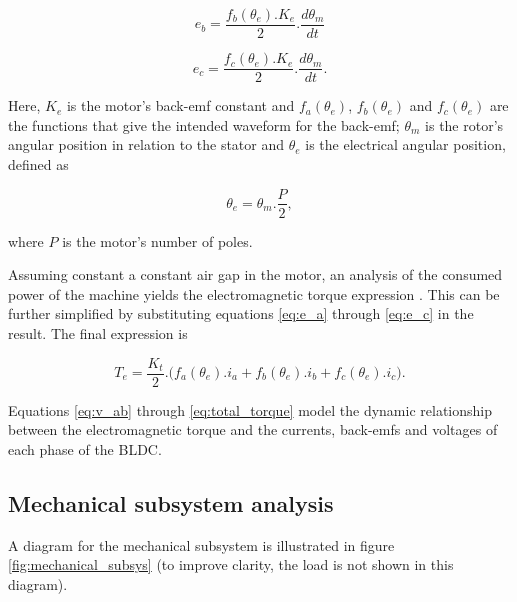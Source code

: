 \documentclass{article}
\begin{document}
    \begin{equation}
        e_b = \frac{f_b(\theta_e).K_e}{2}.\frac{d\theta_m}{dt}
        \label{eq:e_b}
    \end{equation}

    \begin{equation}
        e_c = \frac{f_c(\theta_e).K_e}{2}.\frac{d\theta_m}{dt}.
        \label{eq:e_c}
    \end{equation}

    Here, $K_e$ is the motor's back-emf constant and $f_a(\theta_e)$, $f_b(\theta_e)$ and $f_c(\theta_e)$ are the functions that give the intended waveform for the back-emf; $\theta_m$ is the rotor's angular position in relation to the stator and $\theta_e$ is the electrical angular position, defined as

    \begin{equation}
        \theta_e = \theta_m.\frac{P}{2},
    \end{equation}

    where $P$ is the motor's number of poles.

    Assuming constant a constant air gap in the motor, an analysis of the consumed power of the machine yields the electromagnetic torque expression \cite[p. 459]{ref:electrical_modeling}. This can be further simplified by substituting equations \ref{eq:e_a} through \ref{eq:e_c} in the result. The final expression is

    \begin{equation}
        T_e = \frac{K_t}{2}.\Big(f_a(\theta_e).i_a + f_b(\theta_e).i_b + f_c(\theta_e).i_c\Big).
        \label{eq:total_torque}
    \end{equation}

    Equations \ref{eq:v_ab} through \ref{eq:total_torque} model the dynamic relationship between the electromagnetic torque and the currents, back-emfs and voltages of each phase of the BLDC.




    \subsection{Mechanical subsystem analysis}

    A diagram for the mechanical subsystem is illustrated in figure \ref{fig:mechanical_subsys} (to improve clarity, the load is not shown in this diagram).
\end{document}
